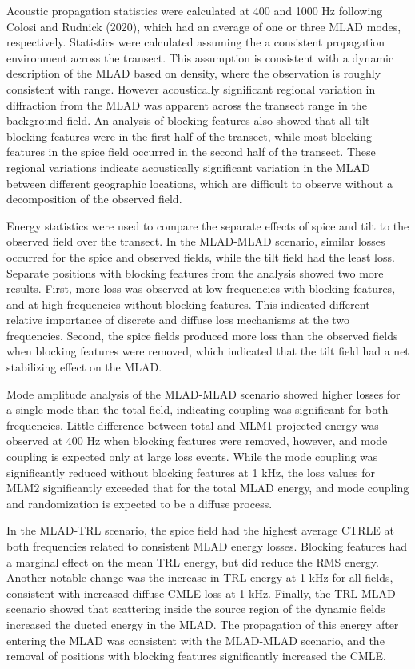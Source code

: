 \documentclass[preprint,NumberedRefs]{JASA}
\begin{document}
Acoustic propagation statistics were calculated at 400 and 1000 Hz following Colosi and Rudnick (2020),\cite{colosi2020observations} which had an average of one or three MLAD modes, respectively. Statistics were calculated assuming the a consistent propagation environment across the transect. This assumption is consistent with a dynamic description of the MLAD based on density,\citep{cole2010seasonal} where the observation is roughly consistent with range. However acoustically significant regional variation in diffraction from the MLAD was apparent across the transect range in the background field. An analysis of blocking features also showed that all tilt blocking features were in the first half of the transect, while most blocking features in the spice field occurred in the second half of the transect. These regional variations indicate acoustically significant variation in the MLAD between different geographic locations, which are difficult to observe without a decomposition of the observed field.

Energy statistics were used to compare the separate effects of spice and tilt to the observed field over the transect. In the MLAD-MLAD scenario, similar losses occurred for the spice and observed fields, while the tilt field had the least loss. Separate positions with blocking features from the analysis showed two more results. First, more loss was observed at low frequencies with blocking features, and at high frequencies without blocking features. This indicated different relative importance of discrete and diffuse loss mechanisms at the two frequencies. Second, the spice fields produced more loss than the observed fields when blocking features were removed, which indicated that the tilt field had a net stabilizing effect on the MLAD.

Mode amplitude analysis of the MLAD-MLAD scenario showed higher losses for a single mode than the total field, indicating coupling was significant for both frequencies. Little difference between total and MLM1 projected energy was observed at 400 Hz when blocking features were removed, however, and mode coupling is expected only at large loss events. While the mode coupling was significantly reduced without blocking features at 1 kHz, the loss values for MLM2 significantly exceeded that for the total MLAD energy, and mode coupling and randomization is expected to be a diffuse process.

In the MLAD-TRL scenario, the spice field had the highest average CTRLE at both frequencies related to consistent MLAD energy losses. Blocking features had a marginal effect on the mean TRL energy, but did reduce the RMS energy. Another notable change was the increase in TRL energy at 1 kHz for all fields, consistent with increased diffuse CMLE loss at 1 kHz. Finally, the TRL-MLAD scenario showed that scattering inside the source region of the dynamic fields increased the ducted energy in the MLAD. The propagation of this energy after entering the MLAD was consistent with the MLAD-MLAD scenario, and the removal of positions with blocking features significantly increased the CMLE.
\end{document}
